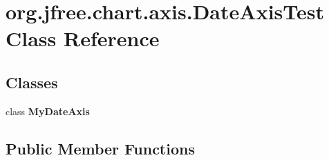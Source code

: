 \hypertarget{classorg_1_1jfree_1_1chart_1_1axis_1_1_date_axis_test}{}\section{org.\+jfree.\+chart.\+axis.\+Date\+Axis\+Test Class Reference}
\label{classorg_1_1jfree_1_1chart_1_1axis_1_1_date_axis_test}
\subsection*{Classes}
\begin{DoxyCompactItemize}
\item 
class {\bfseries My\+Date\+Axis}
\end{DoxyCompactItemize}
\subsection*{Public Member Functions}
